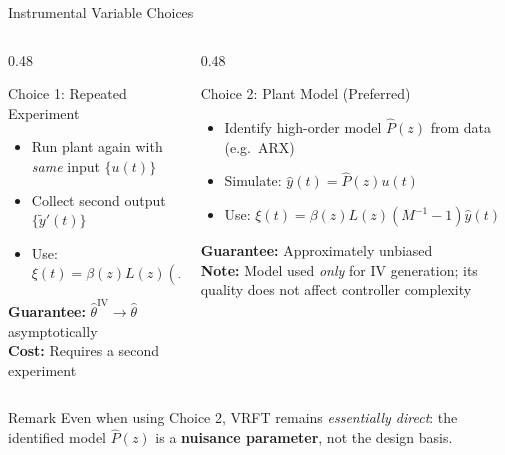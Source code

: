 \documentclass[aspectratio=169]{beamer}
\begin{document}
\begin{frame}{Instrumental Variable Choices}
  \begin{columns}[T]
    \begin{column}{0.48\textwidth}
      \begin{exampleblock}{Choice 1: Repeated Experiment}
        \begin{itemize}
          \item Run plant again with \emph{same} input $\{u(t)\}$
          \item Collect second output $\{\tilde{y}'(t)\}$
          \item Use: $\xi(t) = \beta(z)L(z)(M^{-1}-1)\tilde{y}'(t)$
        \end{itemize}
        \vspace{0.3em}
        \textbf{Guarantee:} $\hat{\theta}^{\mathrm{IV}} \to \hat{\theta}$ asymptotically\\[0.2em]
        \textbf{Cost:} Requires a second experiment
      \end{exampleblock}
    \end{column}
    \begin{column}{0.48\textwidth}
      \begin{exampleblock}{Choice 2: Plant Model (Preferred)}
        \begin{itemize}
          \item Identify high-order model $\hat{P}(z)$ from data (e.g.\ ARX)
          \item Simulate: $\hat{y}(t) = \hat{P}(z)u(t)$
          \item Use: $\xi(t) = \beta(z)L(z)(M^{-1}-1)\hat{y}(t)$
        \end{itemize}
        \vspace{0.3em}
        \textbf{Guarantee:} Approximately unbiased\\[0.2em]
        \textbf{Note:} Model used \emph{only} for IV generation; its quality does not affect controller complexity
      \end{exampleblock}
    \end{column}
  \end{columns}
  \vspace{0.4em}
  \begin{block}{Remark}
    Even when using Choice 2, VRFT remains \emph{essentially direct}: the identified model $\hat{P}(z)$ is a \textbf{nuisance parameter}, not the design basis.
  \end{block}
\end{frame}
\end{document}
